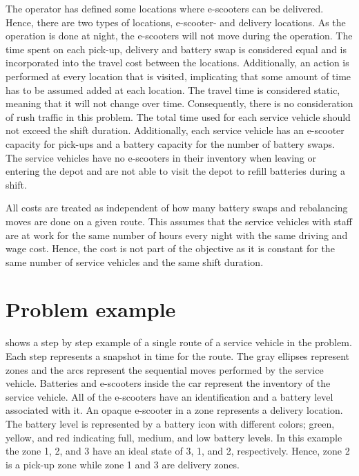 The operator has defined some locations where e-scooters can be delivered. Hence, there are two types of locations, e-scooter- and delivery locations. As the operation is done at night, the e-scooters will not move during the operation. The time spent on each pick-up, delivery and battery swap is considered equal and is incorporated into the travel cost between the locations. Additionally, an action is performed at every location that is visited, implicating that some amount of time has to be assumed added at each location. The travel time is considered static, meaning that it will not change over time. Consequently, there is no consideration of rush traffic in this problem. The total time used for each service vehicle should not exceed the shift duration. Additionally, each service vehicle has an e-scooter capacity for pick-ups and a battery capacity for the number of battery swaps. The service vehicles have no e-scooters in their inventory when leaving or entering the depot and are not able to visit the depot to refill batteries during a shift.

All costs are treated as independent of how many battery swaps and rebalancing moves are done on a given route. This assumes that the service vehicles with staff are at work for the same number of hours every night with the same driving and wage cost. Hence, the cost is not part of the objective as it is constant for the same number of service vehicles and the same shift duration.

\section{Problem example}\label{problem example}

 shows a step by step example of a single route of a service vehicle in the problem. Each step represents a snapshot in time for the route. The gray ellipses represent zones and the arcs represent the sequential moves performed by the service vehicle. Batteries and e-scooters inside the car represent the inventory of the service vehicle. All of the e-scooters have an identification and a battery level associated with it. An opaque e-scooter in a zone represents a delivery location. The battery level is represented by a battery icon with different colors; green, yellow, and red indicating full, medium, and low battery levels. In this example the zone 1, 2, and 3 have an ideal state of 3, 1, and 2, respectively. Hence, zone 2 is a pick-up zone while zone 1 and 3 are delivery zones.

